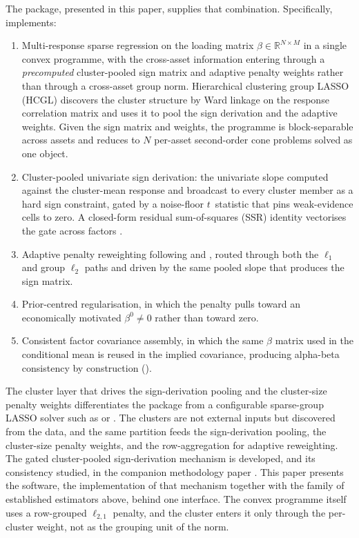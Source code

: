 \documentclass[article]{jss}
\begin{document}
The  package, presented in this paper, supplies that
combination. Specifically,  implements:

\begin{enumerate}
\item Multi-response sparse regression on the loading matrix
$\beta \in \mathbb{R}^{N \times M}$ in a single convex programme,
with the cross-asset information entering through a
\emph{precomputed} cluster-pooled sign matrix and adaptive
penalty weights rather than through a cross-asset group norm.
Hierarchical clustering group LASSO (HCGL) discovers the cluster
structure by Ward linkage on the response correlation matrix and
uses it to pool the sign derivation and the adaptive weights. Given
the sign matrix and weights, the programme is block-separable across
assets and reduces to $N$ per-asset second-order cone problems
solved as one object.
\item Cluster-pooled univariate sign derivation: the univariate slope
computed against the cluster-mean response and broadcast to every
cluster member as a hard sign constraint, gated by a noise-floor
$t$~statistic that pins weak-evidence cells to zero. A closed-form
residual sum-of-squares (SSR) identity vectorises the gate across
factors \citep{Sepp+Kastenholz:2026sign}.
\item Adaptive penalty reweighting following \cite{Zou:2006} and
\cite{Wang+Leng:2008}, routed through both the $\ell_1$ and group $\ell_2$ paths
and driven by the same pooled slope that produces the sign matrix.
\item Prior-centred regularisation, in which the penalty pulls toward
an economically motivated $\beta^{0} \neq 0$ rather than toward zero.
\item Consistent factor covariance assembly, in which the same
$\beta$ matrix used in the conditional mean is reused in the implied
covariance, producing alpha-beta consistency by construction (\cite{Sepp+Hansen+Kastenholz:2026MATF}).
\end{enumerate}

The cluster layer that drives the sign-derivation pooling and the
cluster-size penalty weights differentiates the package from a configurable
sparse-group LASSO solver such as  or . The clusters
are not external inputs but discovered from the data, and the same partition
feeds the sign-derivation pooling, the cluster-size penalty weights, and the
row-aggregation for adaptive reweighting. The gated cluster-pooled
sign-derivation mechanism is developed, and its consistency studied, in the
companion methodology paper \citep{Sepp+Kastenholz:2026sign}. This paper
presents the software, the implementation of that mechanism together with
the family of established estimators above, behind one interface. The convex
programme itself uses a row-grouped $\ell_{2,1}$ penalty, and the cluster
enters it only through the per-cluster weight, not as the grouping unit of
the norm.
\end{document}
